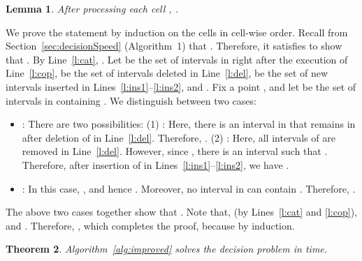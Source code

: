 \documentclass[12pt]{dalthesis}
\def\favoritefont{\bfseries \sffamily}
\def\QED{\ensuremath{{\Box}}}
\def\markatright#1{\leavevmode\unskip\nobreak\quad\hspace*{\fill}{#1}}
\newenvironment{proof}
	{\begin{trivlist}\item[\hskip\labelsep{\favoritefont Proof:}]}
	{\markatright{\QED}\end{trivlist}}
\newtheorem{theorem}{Theorem}
\newtheorem{lemma}[theorem]{Lemma}
\begin{document}
\begin{lemma} \label{lemma:invar}
	After processing each cell ,
	.
\end{lemma}

\begin{proof}
	We prove the statement by induction on the cells in cell-wise order.
	Recall from Section~\ref{sec:decisionSpeed} (Algorithm~1) 
	that .
	Therefore, it satisfies to show that 
	.
	By Line~\ref{l:cat}, .
	Let  be the set of intervals in  right after the execution of Line~\ref{l:cop},
	 be the set of intervals deleted in Line~\ref{l:del},
	 be the set of new intervals inserted in Lines~\ref{l:ins1}--\ref{l:ins2},
	and .
	Fix a point , and let  be the set of intervals in  containing .
	We distinguish between two cases: 
	\begin{itemize}
		\item : There are two possibilities:	
		(1) :
			Here, there is an interval in  that remains in  after
			deletion of  in Line~\ref{l:del}. 
			Therefore, .
		(2) :
			Here, all intervals of  are removed in Line~\ref{l:del}.
			However, since , there is an interval  such that .
			Therefore, after insertion of  in Lines~\ref{l:ins1}--\ref{l:ins2}, we have
			.

		\item  : 
		In this case, ,
		and hence . 
		Moreover, no interval in  can contain .
		Therefore, .
	\end{itemize}
	The above two cases together show that .
	Note that,  (by Lines~\ref{l:cat} and \ref{l:cop}),
	and .
	Therefore, ,
	which completes the proof, because 
	by induction.
\end{proof}


\begin{theorem}
	Algorithm~\ref{alg:improved} solves the decision problem in  time.
\end{theorem}
\end{document}
